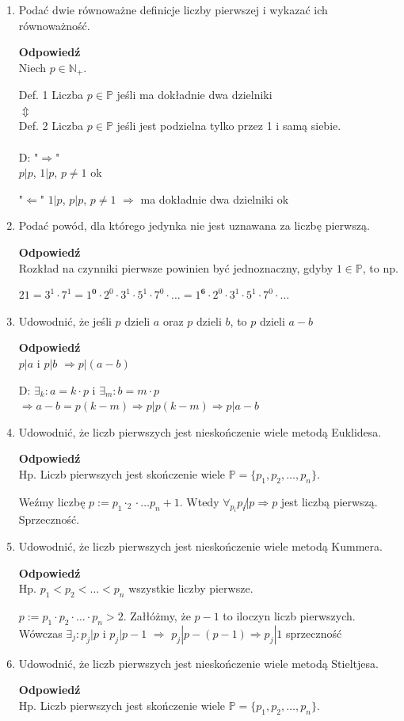 \documentclass[12pt,a4paper]{article}
\theoremstyle{break}
\newcommand{\Odp}[1]{
		\begin{mdframed}[style=zadanie]
			\textbf{Odpowiedź}\\
			#1
		\end{mdframed}
	}
\begin{document}
\begin{enumerate}[1.]
	\item Podać dwie równoważne deﬁnicje liczby pierwszej i wykazać ich równoważność.
	\Odp{
		Niech $p\in \mathbb{N}_+$.
		
		Def. 1 Liczba $p\in \mathbb{P}$ jeśli ma dokładnie dwa dzielniki\\
		$\Updownarrow$\\
		Def. 2 Liczba $p\in \mathbb{P}$ jeśli jest podzielna tylko przez 1 i samą siebie.\\\\
		
		D: "$\Rightarrow$"\\
		$p|p$, $1|p$, $p\neq1$ ok
		
		"$\Leftarrow$"
		$1|p$, $p|p$, $p\neq1$ $\Rightarrow$ ma dokładnie dwa dzielniki ok
		
	}
	
	\item Podać powód, dla którego jedynka nie jest uznawana za liczbę pierwszą.
	\Odp{
		Rozkład na czynniki pierwsze powinien być jednoznaczny, gdyby $1\in\mathbb{P}$, to np.
		
		$21=3^1\cdot7^1=1^\textbf{0}\cdot2^0\cdot3^1\cdot5^1\cdot7^0\cdot\dots=1^\textbf{6}\cdot2^0\cdot3^1\cdot5^1\cdot7^0\cdot\dots$
	}
	
	\item Udowodnić, że jeśli $p$ dzieli $a$ oraz $p$ dzieli $b$, to $p$ dzieli $a - b$
	\Odp{
		$p|a$ i $p|b$ $\Rightarrow p|(a-b)$
		
		D: $\exists_k:a=k\cdot p$ i $\exists_m:b=m\cdot p$ $\Rightarrow a-b=p(k-m) \Rightarrow p|p(k-m) \Rightarrow p|a-b$
	}
	
	\item Udowodnić, że liczb pierwszych jest nieskończenie wiele metodą Euklidesa.
	\Odp{
		Hp. Liczb pierwszych jest skończenie wiele $\mathbb{P}=\{p_1,p_2,\dots,p_n\}$.
		
		Weźmy liczbę $p:=p_1\cdotp_2\cdot\dots p_n + 1$. Wtedy $\forall_{p_i} p_i\not| p \Rightarrow p$ jest liczbą pierwszą. Sprzeczność. 
	}
	\newpage
	\item Udowodnić, że liczb pierwszych jest nieskończenie wiele metodą Kummera.
	\Odp{
		Hp. $p_1<p_2<\dots<p_n$ wszystkie liczby pierwsze.
		
		$p:=p_1\cdot p_2\cdot\dots\cdot p_n > 2$. Załłóżmy, że $p-1$ to iloczyn liczb pierwszych. Wówczas $\exists_j : p_j|p$ i $p_j|p-1$ $\Rightarrow$ $p_j|p-(p-1) \Rightarrow p_j|1$ sprzeczność
	}
	
	\item Udowodnić, że liczb pierwszych jest nieskończenie wiele metodą Stieltjesa.
	\Odp{
		Hp. Liczb pierwszych jest skończenie wiele $\mathbb{P}=\{p_1,p_2,\dots,p_n\}$.
		
}
\end{enumerate}
\end{document}
